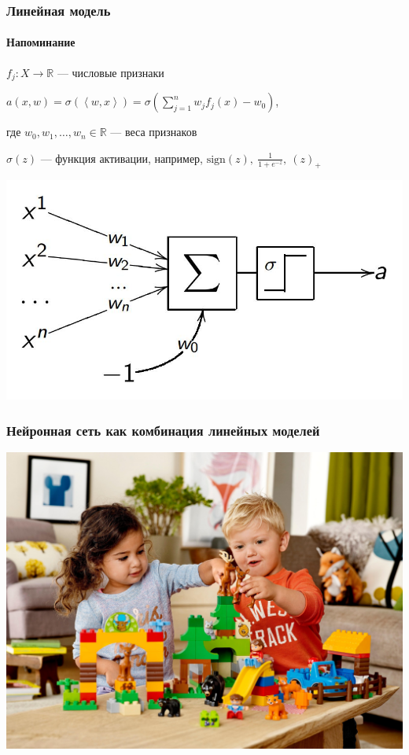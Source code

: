 \documentclass[fullscreen=true, bookmarks=true, hyperref={pdfencoding=unicode}]{beamer}
\begin{document}
\begin{frame}
  \frametitle{Линейная модель}
  \framesubtitle{Напоминание}
  $f_j: X \to \mathbb{R}$ — числовые признаки

  $a(x, w) = \sigma(\left<w, x\right>) = \sigma \left(\sum\limits_{j=1}^n w_j f_j(x) - w_0 \right)$,

  где $w_0, w_1, \dots, w_n \in \mathbb{R}$ — веса признаков

  $\sigma(z)$ — функция активации, например, $\text{sign}(z),\ \frac{1}{1+e^{-z}},\ (z)_+$
  \begin{center}
    \includegraphics[keepaspectratio,
                     height=0.4\paperheight]{lin_as_nn.jpg}
  \end{center}
\end{frame}

\begin{frame}
  \frametitle{Нейронная сеть как комбинация линейных моделей}
  \begin{center}
    \includegraphics[keepaspectratio,
                     height=0.8\paperheight]{nn-as-lego-duplo.jpg}
  \end{center}
\end{frame}
\end{document}
